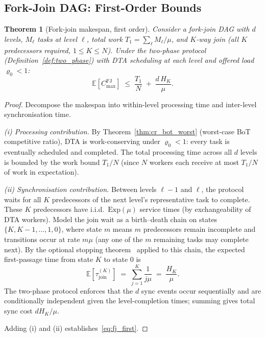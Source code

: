 \documentclass[11pt,a4paper]{report}
\newtheorem{theorem}{Theorem}[section]
\begin{document}
\subsection{Fork-Join DAG: First-Order Bounds}

\begin{theorem}[Fork-join makespan, first order]\label{thm:fj_first}
\label{sec:fj-precondition}
Consider a fork-join DAG with $d$ levels, $M_\ell$ tasks at level $\ell$,
total work $T_1 = \sum_\ell M_\ell/\mu$, and $K$-way join
(all $K$ predecessors required, $1 \leq K \leq N$).
Under the two-phase protocol (Definition~\ref{def:two_phase})
with DTA scheduling at each level and offered load $\varrho_0 < 1$:
\begin{equation}\label{eq:fj_first}
  \mathbb{E}[C_{\max}^{\mathrm{FJ}}]
  \;\leq\;
  \frac{T_1}{N}
  \;+\;
  \frac{d\,H_K}{\mu}.
\end{equation}
\end{theorem}

\begin{proof}
Decompose the makespan into within-level processing time and inter-level
synchronisation time.

\smallskip\noindent
\emph{(i) Processing contribution.}
By Theorem~\ref{thm:cr_bot_worst} (worst-case BoT competitive ratio),
DTA is work-conserving under $\varrho_0 < 1$: every task is eventually
scheduled and completed.
The total processing time across all $d$ levels is bounded by the work
bound $T_1/N$ (since $N$ workers each receive at most $T_1/N$ of work in
expectation).

\smallskip\noindent
\emph{(ii) Synchronisation contribution.}
Between levels $\ell{-}1$ and $\ell$, the protocol waits for all $K$
predecessors of the next level's representative task to complete.
These $K$ predecessors have i.i.d.\ $\mathrm{Exp}(\mu)$ service times
(by exchangeability of DTA workers).
Model the join wait as a birth--death chain on states
$\{K, K-1, \ldots, 1, 0\}$, where state $m$ means $m$ predecessors
remain incomplete and transitions occur at rate $m\mu$ (any one of the $m$
remaining tasks may complete next).
By the optional stopping theorem~\cite{norris1997} applied to this
chain, the expected first-passage time from state $K$ to state $0$ is
\[
  \mathbb{E}[\tau_{\mathrm{join}}^{(K)}]
  \;=\; \sum_{j=1}^K \frac{1}{j\mu}
  \;=\; \frac{H_K}{\mu}.
\]
The two-phase protocol enforces that the $d$ sync events occur
sequentially and are conditionally independent given the level-completion
times; summing gives total sync cost $d H_K/\mu$.

\smallskip\noindent
Adding (i) and (ii) establishes~\eqref{eq:fj_first}.
\end{proof}
\end{document}
